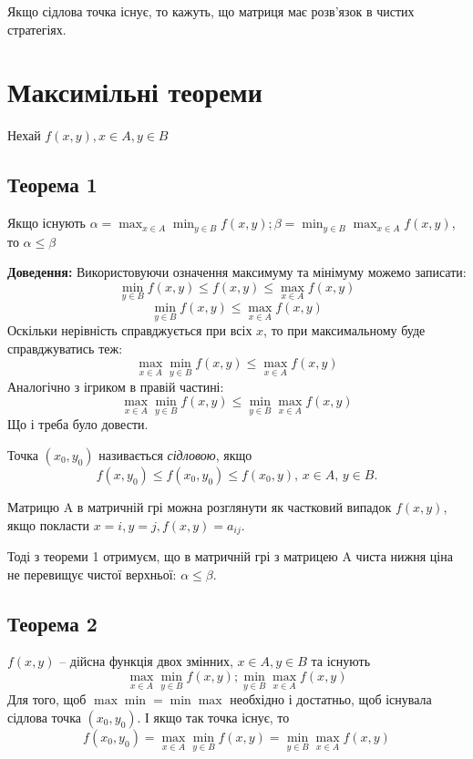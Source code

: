 \documentclass[12pt,a4paper]{book}
\begin{document}
Якщо сідлова точка існує, то кажуть, що матриця має розв'язок в чистих стратегіях.

\section{Максимільні теореми}

Нехай $f(x, y), x \in A, y \in B$

\subsection{Теорема 1}
Якщо існують $\displaystyle \alpha = \max_{x \in A} \min_{y \in B} f(x, y); \beta = \min_{y \in B} \max_{x \in A} f(x, y)$, то $\alpha \le \beta$

{\bf Доведення:}
Використовуючи означення максимуму та мінімуму можемо записати:
\[
\min_{y \in B}f(x, y) \le f(x, y) \le \max_{x \in A}f(x, y)
\]
\[
\min_{y \in B}f(x, y) \le \max_{x \in A}f(x, y)
\]
Оскільки нерівність справджується при всіх $x$, то при максимальному буде справджуватись теж:
\[
\max_{x \in A} \min_{y \in B}f(x, y) \le \max_{x \in A}f(x, y)
\]
Аналогічно з ігриком в правій частині:
\[
\max_{x \in A} \min_{y \in B}f(x, y) \le \min_{y \in B} \max_{x \in A}f(x, y)
\]
Що і треба було довести.


Точка $(x_0, y_0)$ називається \emph{сідловою}, якщо
\begin{equation}
f(x, y_0) \le f(x_0, y_0) \le f(x_0, y),\, x \in A,\, y \in B.
\end{equation}

Матрицю A в матричній грі можна розглянути як частковий випадок $f(x, y)$, якщо покласти $x=i, y=j, f(x, y) = a_{ij}$.

Тоді з теореми 1 отримуєм, що в матричній грі з матрицею A чиста нижня ціна не перевищує чистої верхньої: $\alpha \le \beta$.


\subsection{Теорема 2}
$f(x, y)$ -- дійсна функція двох змінних, $x \in A, y \in B$ та існують
\[
\max_{x \in A} \min_{y \in B}f(x, y); \min_{y \in B} \max_{x \in A}f(x, y)
\]
Для того, щоб $\max\min = \min\max$ необхідно і достатньо, щоб існувала сідлова точка $(x_0, y_0)$. І якщо так точка існує, то
\begin{equation}
f(x_0, y_0)=\max_{x \in A} \min_{y \in B}f(x, y) = \min_{y \in B} \max_{x \in A}f(x, y)
\end{equation}
\end{document}
